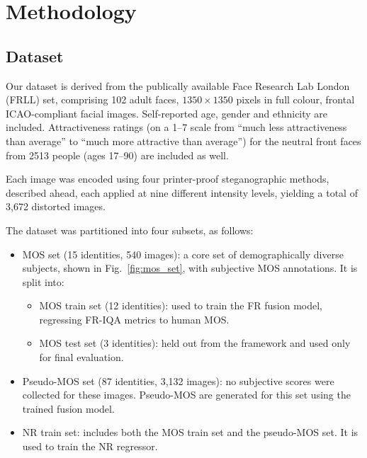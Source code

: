 \chapter{Methodology}\label{chap:methodology}

\section{Dataset}

Our dataset is derived from the publically available Face Research Lab London~\cite{frll} (FRLL) set, comprising 102 adult faces, $1350 \times 1350$ pixels in full colour, frontal ICAO-compliant facial images. Self-reported age, gender and ethnicity are included. Attractiveness ratings (on a 1--7 scale from ``much less attractiveness than average'' to ``much more attractive than average'') for the neutral front faces from 2513 people (ages 17--90) are included as well.

Each image was encoded using four printer-proof steganographic methods, described ahead, each applied at nine different intensity levels, yielding a total of 3,672 distorted images.

The dataset was partitioned into four subsets, as follows:

\begin{itemize}
    \item MOS set (15 identities, 540 images): a core set of demographically diverse subjects, shown in Fig.~\ref{fig:mos_set}, with subjective MOS annotations. It is split into:
    \begin{itemize}
        \item MOS train set (12 identities): used to train the FR fusion model, regressing FR-IQA metrics to human MOS.\@
        \item MOS test set (3 identities): held out from the framework and used only for final evaluation.
    \end{itemize}
    \item Pseudo-MOS set (87 identities, 3,132 images): no subjective scores were collected for these images. Pseudo-MOS are generated for this set using the trained fusion model.
    \item NR train set: includes both the MOS train set and the pseudo-MOS set. It is used to train the NR regressor.
\end{itemize}

